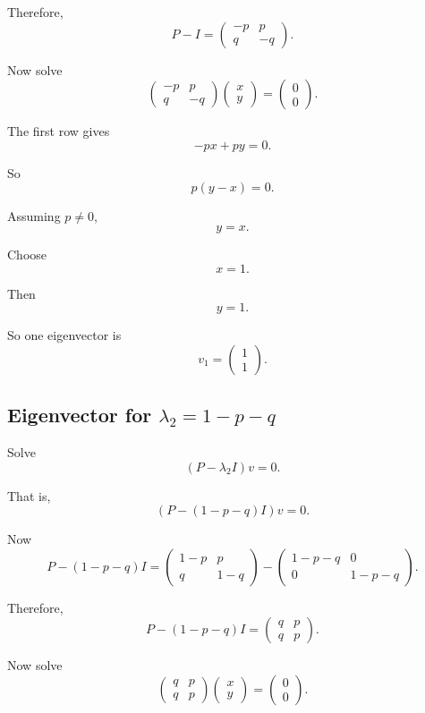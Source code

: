 \documentclass[12pt,a4paper]{article}
\theoremstyle{notestyle}
\begin{document}
Therefore,
\[
P-I
=
\begin{pmatrix}
-p & p\\
q & -q
\end{pmatrix}.
\]

Now solve
\[
\begin{pmatrix}
-p & p\\
q & -q
\end{pmatrix}
\begin{pmatrix}
x\\
y
\end{pmatrix}
=
\begin{pmatrix}
0\\
0
\end{pmatrix}.
\]

The first row gives
\[
-px+py=0.
\]

So
\[
p(y-x)=0.
\]

Assuming $p\neq0$,
\[
y=x.
\]

Choose
\[
x=1.
\]

Then
\[
y=1.
\]

So one eigenvector is
\[
v_1=
\begin{pmatrix}
1\\
1
\end{pmatrix}.
\]

\subsection{Eigenvector for $\lambda_2=1-p-q$}

Solve
\[
(P-\lambda_2 I)v=0.
\]

That is,
\[
\left(P-(1-p-q)I\right)v=0.
\]

Now
\[
P-(1-p-q)I
=
\begin{pmatrix}
1-p & p\\
q & 1-q
\end{pmatrix}
-
\begin{pmatrix}
1-p-q & 0\\
0 & 1-p-q
\end{pmatrix}.
\]

Therefore,
\[
P-(1-p-q)I
=
\begin{pmatrix}
q & p\\
q & p
\end{pmatrix}.
\]

Now solve
\[
\begin{pmatrix}
q & p\\
q & p
\end{pmatrix}
\begin{pmatrix}
x\\
y
\end{pmatrix}
=
\begin{pmatrix}
0\\
0
\end{pmatrix}.
\]
\end{document}
